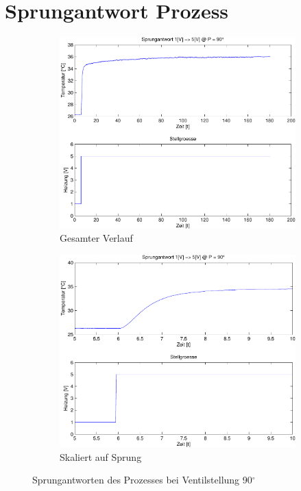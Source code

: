 \section{Sprungantwort Prozess}

\begin{figure}[h!]
	\centering
	\begin{subfigure}{0.475\textwidth}
		\includegraphics[width=1\textwidth]{03/step_full.pdf}
		\caption{Gesamter Verlauf}
	\end{subfigure}
	\hfill{}
	\begin{subfigure}{0.475\textwidth}
		\includegraphics[width=1\textwidth]{03/step_full_scale.pdf}
		\caption{Skaliert auf Sprung}
	\end{subfigure}
	\caption{Sprungantworten des Prozesses bei Ventilstellung 90$^\circ$}
\end{figure}

